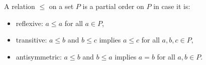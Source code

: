 A relation $\leq$ on a set $P$ is a partial order on $P$ in case it is:
\begin{itemize}
\item reflexive: $a \leq a$ for all $a \in P$,
\item transitive: $a \leq b$ and $b \leq c$ implies $a \leq c$ for all $a, b, c \in P$,
\item antisymmetric: $a \leq b$ and $b \leq a$ implies $a = b$ for all $a, b \in P$.
\end{itemize}
